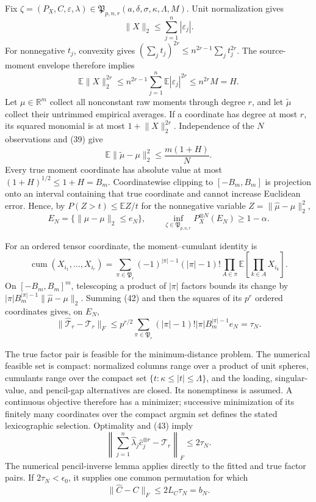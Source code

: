 Fix \(\zeta=(P_X,C,\varepsilon,\lambda)\in\mathfrak P_{p,n,r}(a,\delta,\sigma,\kappa,\Lambda,M)\). Unit normalization gives
\[
 \lVert X\rVert_2\le\sum_{j=1}^n|\varepsilon_j|.
\]
For nonnegative \(t_j\), convexity gives \((\sum_jt_j)^{2r}\le n^{2r-1}\sum_jt_j^{2r}\). The source-moment envelope therefore implies
\[
 \mathbb E\lVert X\rVert_2^{2r}
 \le n^{2r-1}\sum_{j=1}^n\mathbb E|\varepsilon_j|^{2r}
 \le n^{2r}M=H. \tag{39}
\]
Let \(\mu\in\mathbb R^m\) collect all nonconstant raw moments through degree \(r\), and let \(\widetilde\mu\) collect their untrimmed empirical averages. If a coordinate has degree at most \(r\), its squared monomial is at most \(1+\lVert X\rVert_2^{2r}\). Independence of the \(N\) observations and (39) give
\[
 \mathbb E\lVert\widetilde\mu-\mu\rVert_2^2
 \le\frac{m(1+H)}{N}. \tag{40}
\]
Every true moment coordinate has absolute value at most \((1+H)^{1/2}\le1+H=B_m\). Coordinatewise clipping to \([-B_m,B_m]\) is projection onto an interval containing that true coordinate and cannot increase Euclidean error. Hence, by \(P(Z>t)\le\mathbb E Z/t\) for the nonnegative variable \(Z=\lVert\widehat\mu-\mu\rVert_2^2\),
\[
 E_N=\{\lVert\widehat\mu-\mu\rVert_2\le e_N\},
 \qquad
 \inf_{\zeta\in\mathfrak P_{p,n,r}}P_X^{\otimes N}(E_N)\ge1-\alpha. \tag{41}
\]

For an ordered tensor coordinate, the moment--cumulant identity is
\[
 \operatorname{cum}(X_{i_1},\ldots,X_{i_r})
 =\sum_{\pi\in\mathfrak P_r}(-1)^{|\pi|-1}(|\pi|-1)!
 \prod_{A\in\pi}\mathbb E\!\left[\prod_{k\in A}X_{i_k}\right]. \tag{42}
\]
On \([-B_m,B_m]^m\), telescoping a product of \(|\pi|\) factors bounds its change by \(|\pi|B_m^{|\pi|-1}\lVert\widehat\mu-\mu\rVert_2\). Summing (42) and then the squares of its \(p^r\) ordered coordinates gives, on \(E_N\),
\[
 \lVert\widehat{\mathcal T}_r-\mathcal T_r\rVert_F
 \le p^{r/2}\sum_{\pi\in\mathfrak P_r}(|\pi|-1)!|\pi|B_m^{|\pi|-1}e_N
 =\tau_N. \tag{43}
\]

The true factor pair is feasible for the minimum-distance problem. The numerical feasible set is compact: normalized columns range over a product of unit spheres, cumulants range over the compact set \(\{t:\kappa\le|t|\le\Lambda\}\), and the loading, singular-value, and pencil-gap alternatives are closed. Its nonemptiness is assumed. A continuous objective therefore has a minimizer; successive minimization of its finitely many coordinates over the compact argmin set defines the stated lexicographic selection. Optimality and (43) imply
\[
 \left\lVert\sum_{j=1}^n\widehat\lambda_j\widehat c_j^{\otimes r}-\mathcal T_r\right\rVert_F
 \le2\tau_N. \tag{44}
\]
The numerical pencil-inverse lemma applies directly to the fitted and true factor pairs. If \(2\tau_N<\epsilon_0\), it supplies one common permutation for which
\[
 \lVert\widehat C-C\rVert_F\le2L_C\tau_N=b_N. \tag{45}
\]


